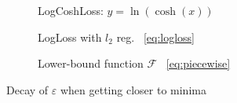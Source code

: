 \begin{figure}[H] \label{graph:eps_graphs}
\centering
\begin{subfigure}{0.3\textwidth}

\caption{LogCoshLoss: $y = \ln(\cosh(x))$ }
\end{subfigure}
\hfill
\begin{subfigure}{0.3\textwidth}

\caption{LogLoss with $l_2$ reg.  ~\eqref{eq:logloss}}
\end{subfigure}
\hfill
\begin{subfigure}{0.3\textwidth}

\caption{Lower-bound function $\mathcal{F} $ ~\eqref{eq:piecewise}}
\end{subfigure}


\caption{Decay of $\varepsilon$ when getting closer to minima}
\end{figure}